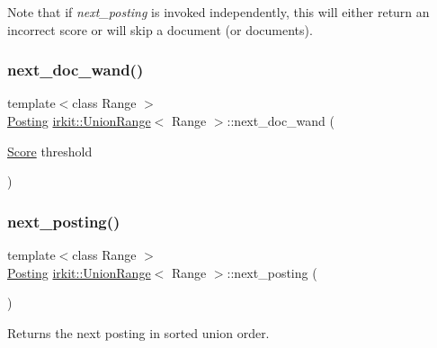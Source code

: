 Note that if {\itshape next\+\_\+posting} is invoked independently, this will either return an incorrect score or will skip a document (or documents). \mbox{\label{classirkit_1_1UnionRange_a6f6bf3aa9d7d273371a9477b88c54737}} 
\subsubsection{\texorpdfstring{next\+\_\+doc\+\_\+wand()}{next\_doc\_wand()}}
{\footnotesize\ttfamily template$<$class Range $>$ \\
\hyperlink{classirkit_1_1UnionRange_a5f694970419f5a60d7fd41d740556229}{Posting} \hyperlink{classirkit_1_1UnionRange}{irkit\+::\+Union\+Range}$<$ Range $>$\+::next\+\_\+doc\+\_\+wand (\begin{DoxyParamCaption}\item[{\hyperlink{classirkit_1_1UnionRange_a47fb098a85581f5e33f4203e16245dae}{Score}}]{threshold }\end{DoxyParamCaption})\hspace{0.3cm}{\ttfamily [inline]}}

\mbox{\label{classirkit_1_1UnionRange_aedb2ab6f4a5f0b9f57cf2c55214ed42e}} 
\subsubsection{\texorpdfstring{next\+\_\+posting()}{next\_posting()}}
{\footnotesize\ttfamily template$<$class Range $>$ \\
\hyperlink{classirkit_1_1UnionRange_a5f694970419f5a60d7fd41d740556229}{Posting} \hyperlink{classirkit_1_1UnionRange}{irkit\+::\+Union\+Range}$<$ Range $>$\+::next\+\_\+posting (\begin{DoxyParamCaption}{ }\end{DoxyParamCaption})\hspace{0.3cm}{\ttfamily [inline]}}



Returns the next posting in sorted union order. 

